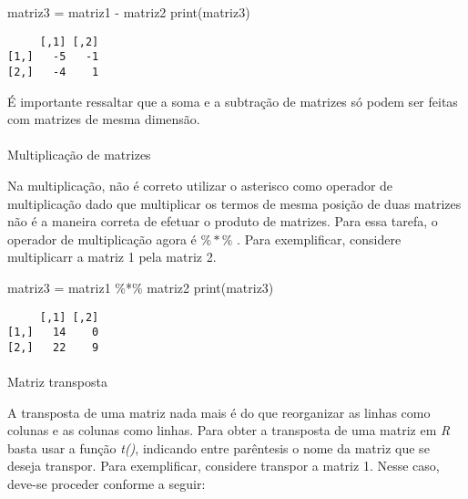 \documentclass[
  letterpaper,
  DIV=11,
  numbers=noendperiod]{scrreprt}
\makeatletter
\let\oldparagraph\paragraph
\renewcommand{\paragraph}{
    \@ifstar
      \xxxParagraphStar
      \xxxParagraphNoStar
  }
\newcommand{\xxxParagraphStar}[1]{\oldparagraph*{#1}\mbox{}}
\newcommand{\xxxParagraphNoStar}[1]{\oldparagraph{#1}\mbox{}}
\newenvironment{Shaded}{\begin{snugshade}}{\end{snugshade}}
\newcommand{\FunctionTok}[1]{\textcolor[rgb]{0.28,0.35,0.67}{#1}}
\newcommand{\NormalTok}[1]{\textcolor[rgb]{0.00,0.23,0.31}{#1}}
\newcommand{\OtherTok}[1]{\textcolor[rgb]{0.00,0.23,0.31}{#1}}
\newcommand{\SpecialCharTok}[1]{\textcolor[rgb]{0.37,0.37,0.37}{#1}}
\makeatother
\begin{document}
\begin{Shaded}
\begin{Highlighting}[]
\NormalTok{matriz3 }\OtherTok{=}\NormalTok{ matriz1 }\SpecialCharTok{{-}}\NormalTok{ matriz2}
\FunctionTok{print}\NormalTok{(matriz3)}
\end{Highlighting}
\end{Shaded}

\begin{verbatim}
     [,1] [,2]
[1,]   -5   -1
[2,]   -4    1
\end{verbatim}

É importante ressaltar que a soma e a subtração de matrizes só podem ser
feitas com matrizes de mesma dimensão.

\paragraph{Multiplicação de
matrizes}\label{multiplicauxe7uxe3o-de-matrizes}

Na multiplicação, não é correto utilizar o asterisco como operador de
multiplicação dado que multiplicar os termos de mesma posição de duas
matrizes não é a maneira correta de efetuar o produto de matrizes. Para
essa tarefa, o operador de multiplicação agora é \(\%*\%\) . Para
exemplificar, considere multiplicarr a matriz 1 pela matriz 2.

\begin{Shaded}
\begin{Highlighting}[]
\NormalTok{matriz3 }\OtherTok{=}\NormalTok{ matriz1 }\SpecialCharTok{\%*\%}\NormalTok{ matriz2}
\FunctionTok{print}\NormalTok{(matriz3)}
\end{Highlighting}
\end{Shaded}

\begin{verbatim}
     [,1] [,2]
[1,]   14    0
[2,]   22    9
\end{verbatim}

\paragraph{Matriz transposta}\label{matriz-transposta}

A transposta de uma matriz nada mais é do que reorganizar as linhas como
colunas e as colunas como linhas. Para obter a transposta de uma matriz
em \emph{R} basta usar a função \emph{t()}, indicando entre parêntesis o
nome da matriz que se deseja transpor. Para exemplificar, considere
transpor a matriz 1. Nesse caso, deve-se proceder conforme a seguir:
\end{document}
